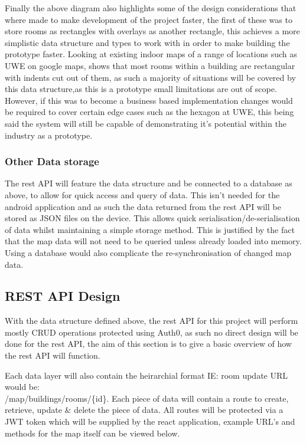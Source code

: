 Finally the above diagram also highlights some of the design considerations that where made to make development of the project faster, the first of these was to store rooms as rectangles with overlays as another rectangle, this achieves a more simplistic data structure and types to work with in order to make building the prototype faster. Looking at existing indoor maps of a range of locations such as UWE on google maps, shows that most rooms within a building are rectangular with indents cut out of them, as such a majority of situations will be covered by this data structure,as this is a prototype small limitations are out of scope. However, if this was to become a business based implementation changes would be required to cover certain edge cases such as the hexagon at UWE, this being said the system will still be capable of demonstrating it's potential within the industry as a prototype.

\subsubsection{Other Data storage}
The rest API will feature the data structure and be connected to a database as above, to allow for quick access and query of data. This isn't needed for the android application and as such the data returned from the rest API will be stored as JSON files on the device. This allows quick serialisation/de-serialisation of data whilst maintaining a simple storage method. This is justified by the fact that the map data will not need to be queried unless already loaded into memory. Using a database would also complicate the re-synchronisation of changed map data.

\newpage
\subsection{REST API Design}
With the data structure defined above, the rest API for this project will perform mostly CRUD operations protected using Auth0, as such no direct design will be done for the rest API, the aim of this section is to give a basic overview of how the rest API will function.

Each data layer will also contain the heirarchial format IE: room update URL would be:\\ /map/buildings/rooms/\{id\}. Each piece of data will contain a route to create, retrieve, update \& delete the piece of data. All routes will be protected via a JWT token which will be supplied by the react application, example URL's and methods for the map itself can be viewed below.

